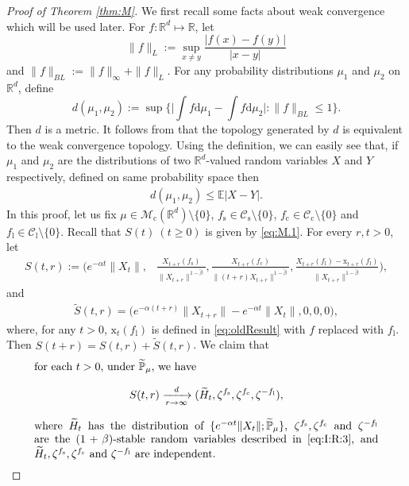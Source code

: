 \documentclass[12pt,a4paper]{amsart}
\theoremstyle{plain}
\theoremstyle{definition}
\numberwithin{equation}{section}
\begin{document}
\begin{proof}[Proof of Theorem \ref{thm:M}]
 We first recall some facts about weak convergence which will be used later. For $f:\mathbb R^d\mapsto \mathbb R$, let
 $$
 \|f\|_L:=\sup_{x\neq y}\frac{|f(x)-f(y)|}{|x-y|}
 $$
 and $\|f\|_{BL}:= \|f\|_{\infty}+\|f\|_L. $
 For any probability distributions $\mu_1$ and $\mu_2$ on $\mathbb R^d$, define
\[
  d(\mu_1,\mu_2)
  :=\sup\Big\{\Big|\int f \mathrm d\mu_1-\int f \mathrm d\mu_2\Big|:\|f\|_{BL}\leq 1\Big\}.
\]
Then $d$ is a metric. It follows from \cite[Theorem 11.3.3]{Dudley2002} that the topology generated by $d$ is equivalent to the weak convergence topology.
Using the definition, we can easily see that, if $\mu_1$ and $\mu_2$ are the distributions of two $\mathbb R^d $-valued random variables $X$ and $Y$ respectively,
defined on same probability space then
\begin{align}\label{ineq: distribution control}
  d(\mu_1,\mu_2) \leq \mathbb E|X-Y|.
\end{align}
In this proof, let us fix $\mu\in \mathcal M_\mathrm c(\mathbb R^d)\setminus \{0\}$, $f_\mathrm s\in \mathcal C_\mathrm s\setminus\{0\}$, $f_\mathrm c \in \mathcal C_\mathrm c\setminus\{0\}$ and $f_\mathrm l \in \mathcal C_\mathrm l\setminus\{0\}$.
Recall that $S(t)~(t\geq 0)$ is given by \eqref{eq:M.1}.
For every $r,t> 0$, let
\begin{align}
 S(t,r):=\Big(e^{-\alpha t}\|X_t\|,& \frac{X_{t+r}(f_\mathrm s)}{\|X_{t+r}\|^{1-\tilde{\beta}}}, \frac{X_{t+r}(f_\mathrm c)}{\|(t+r)X_{t+r}\|^{1-\tilde{\beta}}}, \frac{X_{t+r}(f_\mathrm l)-\mathrm x_{t+r}(f_\mathrm l) }{\|X_{t+r}\|^{1-\tilde{\beta}}}\Big),
\end{align}
and
\begin{align}
\widetilde{S}(t,r)= \Big(e^{-\alpha (t+r)}\|X_{t+r}\|-e^{-\alpha t}\|X_t\|,0,0,0\Big),
\end{align}
where, for any $t>0$, $\mathrm x_t(f_\mathrm l)$ is defined in \eqref{eq:oldResult} with $f$ replaced with $f_\mathrm l$.
Then $S(t+r)=S(t,r)+\widetilde{S}(t,r)$.
We claim that
\begin{equation}\label{eq:M.3}
\begin{minipage}{0.9\textwidth}
	for each $t> 0$, under $\widetilde{\mathbb P}_{\mu}$, we have
	\[
	S(t,r)\xrightarrow[r\rightarrow \infty]{d} (\widetilde H_t,\zeta^{f_\mathrm s},\zeta^{f_\mathrm c},\zeta^{-f_\mathrm l}),
	\]
	where $\widetilde H_t$ has the distribution of $\{e^{-\alpha t} \|X_t\|; \widetilde {\mathbb P}_\mu\}$,
	$\zeta^{f_\mathrm s},\zeta^{f_\mathrm c}$ and $\zeta^{-f_\mathrm l}$ are the $(1+\beta)$-stable random variables described in \eqref{eq:I:R:3}, 
	and $\widetilde H_t,\zeta^{f_\mathrm s},\zeta^{f_\mathrm c}$ and $\zeta^{-f_\mathrm l}$ are independent.
\end{minipage}
\end{equation}


\end{proof}
\end{document}
